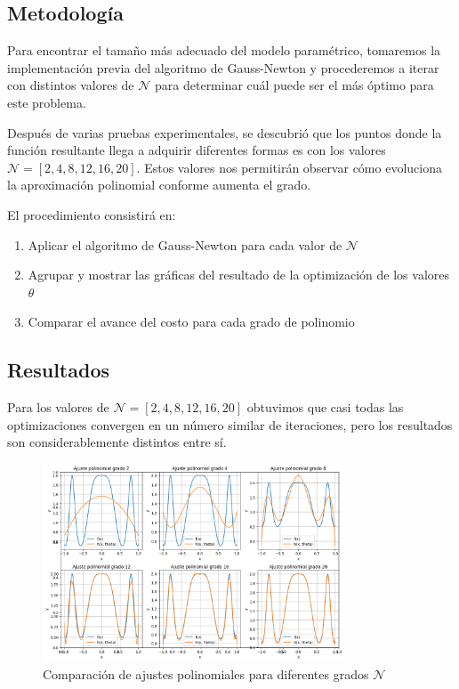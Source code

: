 \documentclass{article}
\begin{document}
\subsection{Metodología}

Para encontrar el tamaño más adecuado del modelo paramétrico, tomaremos la implementación previa del algoritmo de Gauss-Newton y procederemos a iterar con distintos valores de $\mathcal{N}$ para determinar cuál puede ser el más óptimo para este problema.

Después de varias pruebas experimentales, se descubrió que los puntos donde la función resultante llega a adquirir diferentes formas es con los valores $\mathcal{N} = [2, 4, 8, 12, 16, 20]$. Estos valores nos permitirán observar cómo evoluciona la aproximación polinomial conforme aumenta el grado.

El procedimiento consistirá en:
\begin{enumerate}
    \item Aplicar el algoritmo de Gauss-Newton para cada valor de $\mathcal{N}$
    \item Agrupar y mostrar las gráficas del resultado de la optimización de los valores $\theta$
    \item Comparar el avance del costo para cada grado de polinomio
\end{enumerate}

\subsection{Resultados}
\setcounter{equation}{0}

Para los valores de $\mathcal{N} = [2, 4, 8, 12, 16, 20]$ obtuvimos que casi todas las optimizaciones convergen en un número similar de iteraciones, pero los resultados son considerablemente distintos entre sí.

\begin{figure}[H]
    \centering
    \includegraphics[width=0.8\textwidth]{images/2_comparasion_Ns.png}
    \caption{Comparación de ajustes polinomiales para diferentes grados $\mathcal{N}$}
    \label{fig:comparison_N}
\end{figure}
\end{document}
